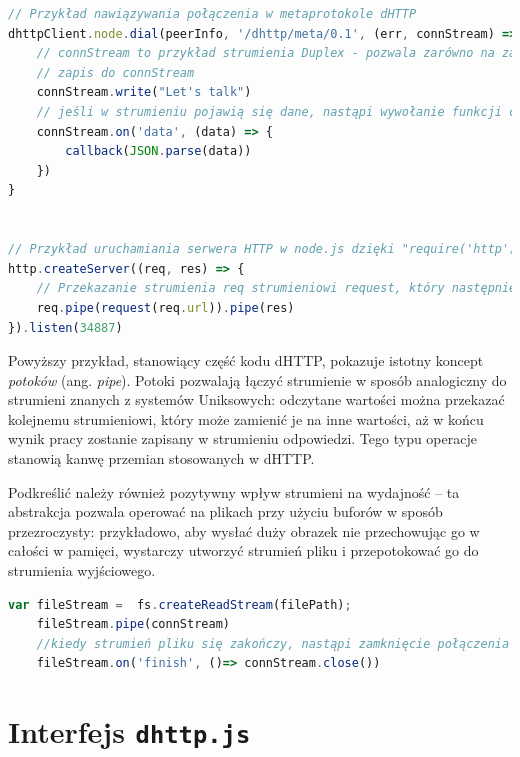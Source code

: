 \begin{lstlisting}[language=javascript]
// Przykład nawiązywania połączenia w metaprotokole dHTTP
dhttpClient.node.dial(peerInfo, '/dhttp/meta/0.1', (err, connStream) => {
    // connStream to przykład strumienia Duplex - pozwala zarówno na zapis, jak i odczyt.
    // zapis do connStream
    connStream.write("Let's talk")
    // jeśli w strumieniu pojawią się dane, nastąpi wywołanie funkcji callback. Warto zauważyć, że to wywołanie może nastąpić zarówno przed, jak i po zawołaniu write -- zależy od stanu strumienia, który może otrzymywać dane w innych miejscach programu
    connStream.on('data', (data) => {
        callback(JSON.parse(data))
    })
}


// Przykład uruchamiania serwera HTTP w node.js dzięki "require('http')"
http.createServer((req, res) => {
    // Przekazanie strumienia req strumieniowi request, który następnie zostanie przekazany do res. W efekcie zadziałamy jako najprostsze proxy - otrzymamy dane o oryginalnym zapytaniu, wywołamy je z punktu widzenia serwera, i przekażemy wynik w ramach odpowiedzi.
    req.pipe(request(req.url)).pipe(res)
}).listen(34887)
\end{lstlisting}

Powyższy przykład, stanowiący część kodu dHTTP, pokazuje istotny koncept {\em potoków} (ang. {\em pipe}). Potoki pozwalają łączyć strumienie w sposób analogiczny do strumieni znanych z systemów Uniksowych: odczytane wartości można przekazać kolejnemu strumieniowi, który może zamienić je na inne wartości, aż w końcu wynik pracy zostanie zapisany w strumieniu odpowiedzi. Tego typu operacje stanowią kanwę przemian stosowanych w dHTTP.

Podkreślić należy również pozytywny wpływ strumieni na wydajność -- ta abstrakcja pozwala operować na plikach przy użyciu buforów w sposób przezroczysty: przykładowo, aby wysłać duży obrazek nie przechowując go w całości w pamięci, wystarczy utworzyć strumień pliku i przepotokować go do strumienia wyjściowego.

\begin{lstlisting}[language=javascript]
    var fileStream =  fs.createReadStream(filePath);
    fileStream.pipe(connStream)
    //kiedy strumień pliku się zakończy, nastąpi zamknięcie połączenia aby poinformować odbiorcę, że nic już na niego nie czeka
    fileStream.on('finish', ()=> connStream.close())
\end{lstlisting}

\section{Interfejs \texttt{dhttp.js}}

